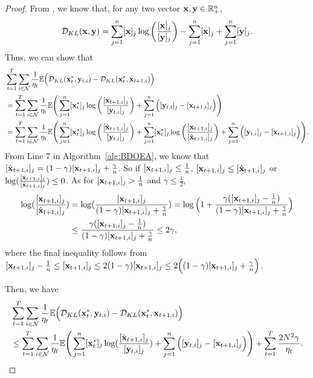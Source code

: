	\begin{proof}
From \cite{nesterov2013introductory}, we know that, for any two vector $\mathbf{x},\mathbf{y}\in\mathbb{R}^{n}_{+}$, 
\begin{equation*}
	\mathcal{D}_{KL}(\mathbf{x},\mathbf{y})=\sum_{j=1}^{n}[\mathbf{x}]_{j}\log\left(\frac{[\mathbf{x}]_{j}}{[\mathbf{y}]_{j}}\right)-\sum_{j=1}^{n}[\mathbf{x}]_{j}+\sum_{j=1}^{n}[\mathbf{y}]_{j}.
\end{equation*}
Thus, we can show that
		\begin{equation*}
			\begin{aligned}
				&\sum_{t=1}^{T}\sum_{i\in\mathcal{N}}\frac{1}{\eta_{t}}\mathbb{E}\Big(\mathcal{D}_{KL}(\mathbf{x}^{*}_{t},\mathbf{y}_{t,i})-\mathcal{D}_{KL}(\mathbf{x}^{*}_{t},\mathbf{x}_{t+1,i})\Big)\\
				&=\sum_{t=1}^{T}\sum_{i\in\mathcal{N}}\frac{1}{\eta_{t}}\mathbb{E}\Bigg(\sum_{j=1}^{n}[\mathbf{x}_{t}^{*}]_{j}\log\left(\frac{[\mathbf{x}_{t+1,i}]_{j}}{[\mathbf{y}_{t,i}]_{j}}\right)+\sum_{j=1}^{n}\Big([\mathbf{y}_{t,i}]_{j}-[\mathbf{x}_{t+1,i}]_{j}\Big)\Bigg)\\
				&=\sum_{t=1}^{T}\sum_{i\in\mathcal{N}}\frac{1}{\eta_{t}}\mathbb{E}\Bigg(\sum_{j=1}^{n}[\mathbf{x}_{t}^{*}]_{j}\log\left(\frac{[\hat{\mathbf{x}}_{t+1,i}]_{j}}{[\mathbf{y}_{t,i}]_{j}}\right)+\sum_{j=1}^{n}[\mathbf{x}_{t}^{*}]_{j}\log\left(\frac{[\mathbf{x}_{t+1,i}]_{j}}{[\hat{\mathbf{x}}_{t+1,i}]_{j}}\right)+\sum_{j=1}^{n}\Big([\mathbf{y}_{t,i}]_{j}-[\mathbf{x}_{t+1,i}]_{j}\Big)\Bigg).
			\end{aligned}
		\end{equation*}
	From Line 7 in Algorithm~\ref{alg:BDOEA}, we know that $[\hat{\mathbf{x}}_{t+1,i}]_{j}=(1-\gamma)[\mathbf{x}_{t+1,i}]_{j}+\frac{\gamma}{n}$. So if  $[\mathbf{x}_{t+1,i}]_{j}\le\frac{1}{n}$, $[\mathbf{x}_{t+1,i}]_{j}\le[\hat{\mathbf{x}}_{t+1,i}]_{j}$ or $\log(\frac{[\mathbf{x}_{t+1,i}]_{j}}{[\hat{\mathbf{x}}_{t+1,i}]_{j}})\le0$. As for $[\mathbf{x}_{t+1,i}]_{j}>\frac{1}{n}$ and $\gamma\le\frac{1}{2}$,
	\begin{equation*}
	\begin{aligned}
		\log(\frac{[\mathbf{x}_{t+1,i}]_{j}}{[\hat{\mathbf{x}}_{t+1,i}]_{j}})&=	\log(\frac{[\mathbf{x}_{t+1,i}]_{j}}{(1-\gamma)[\mathbf{x}_{t+1,i}]_{j}+\frac{\gamma}{n}})=\log\Big(1+\frac{\gamma([\mathbf{x}_{t+1,i}]_{j}-\frac{1}{n})}{(1-\gamma)[\mathbf{x}_{t+1,i}]_{j}+\frac{\gamma}{n}}\Big)\\&\le \frac{\gamma([\mathbf{x}_{t+1,i}]_{j}-\frac{1}{n})}{(1-\gamma)[\mathbf{x}_{t+1,i}]_{j}+\frac{\gamma}{n}}\le2\gamma, 
	\end{aligned}
	\end{equation*} where the final inequality follows from 
		$[\mathbf{x}_{t+1,i}]_{j}-\frac{1}{n}\le[\mathbf{x}_{t+1,i}]_{j}\le2(1-\gamma)[\mathbf{x}_{t+1,i}]_{j}\le2\Big((1-\gamma)[\mathbf{x}_{t+1,i}]_{j}+\frac{\gamma}{n}\Big)$.
		
		Then, we have 
		\begin{equation*}
			\begin{aligned}
				&\sum_{t=1}^{T}\sum_{i\in\mathcal{N}}\frac{1}{\eta_{t}}\mathbb{E}\Big(\mathcal{D}_{KL}(\mathbf{x}^{*}_{t},\mathbf{y}_{t,i})-\mathcal{D}_{KL}(\mathbf{x}^{*}_{t},\mathbf{x}_{t+1,i})\Big)\\
				&\le\sum_{t=1}^{T}\sum_{i\in\mathcal{N}}\frac{1}{\eta_{t}}\mathbb{E}\Bigg(\sum_{j=1}^{n}[\mathbf{x}_{t}^{*}]_{j}\log(\frac{[\hat{\mathbf{x}}_{t+1,i}]_{j}}{[\mathbf{y}_{t,i}]_{j}})+\sum_{j=1}^{n}\Big([\mathbf{y}_{t,i}]_{j}-[\mathbf{x}_{t+1,i}]_{j}\Big)\Bigg)+\sum_{t=1}^{T}\frac{2N^{2}\gamma}{\eta_{t}}.
			\end{aligned}
		\end{equation*}
	\end{proof}
